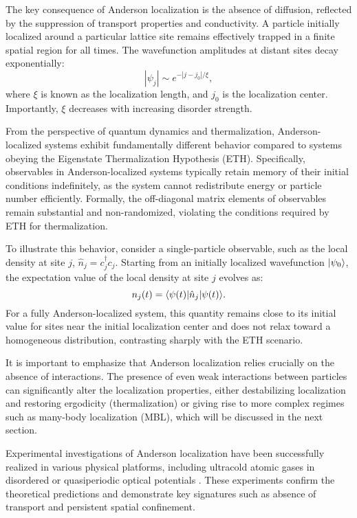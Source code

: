 The key consequence of Anderson localization is the absence of diffusion, reflected by the suppression of transport properties and conductivity. A particle initially localized around a particular lattice site remains effectively trapped in a finite spatial region for all times. The wavefunction amplitudes at distant sites decay exponentially:
\begin{equation*}
|\psi_j| \sim e^{-|j-j_0|/\xi},
\end{equation*}
where $\xi$ is known as the localization length, and $j_0$ is the localization center. Importantly, $\xi$ decreases with increasing disorder strength.

From the perspective of quantum dynamics and thermalization, Anderson-localized systems exhibit fundamentally different behavior compared to systems obeying the Eigenstate Thermalization Hypothesis (ETH). Specifically, observables in Anderson-localized systems typically retain memory of their initial conditions indefinitely, as the system cannot redistribute energy or particle number efficiently. Formally, the off-diagonal matrix elements of observables remain substantial and non-randomized, violating the conditions required by ETH for thermalization.

To illustrate this behavior, consider a single-particle observable, such as the local density at site $j$, $\hat{n}_j = c_j^\dagger c_j$. Starting from an initially localized wavefunction $\left| \psi_0 \right\rangle$, the expectation value of the local density at site $j$ evolves as:
\begin{equation*}
n_j(t) = \bk{\psi(t)}[\hat{n}_j]{\psi(t)}.
\end{equation*}
For a fully Anderson-localized system, this quantity remains close to its initial value for sites near the initial localization center and does not relax toward a homogeneous distribution, contrasting sharply with the ETH scenario.

It is important to emphasize that Anderson localization relies crucially on the absence of interactions. The presence of even weak interactions between particles can significantly alter the localization properties, either destabilizing localization and restoring ergodicity (thermalization) or giving rise to more complex regimes such as many-body localization (MBL), which will be discussed in the next section.

Experimental investigations of Anderson localization have been successfully realized in various physical platforms, including ultracold atomic gases in disordered or quasiperiodic optical potentials \cite{billy_direct_2008, roati_anderson_2008}. These experiments confirm the theoretical predictions and demonstrate key signatures such as absence of transport and persistent spatial confinement.

